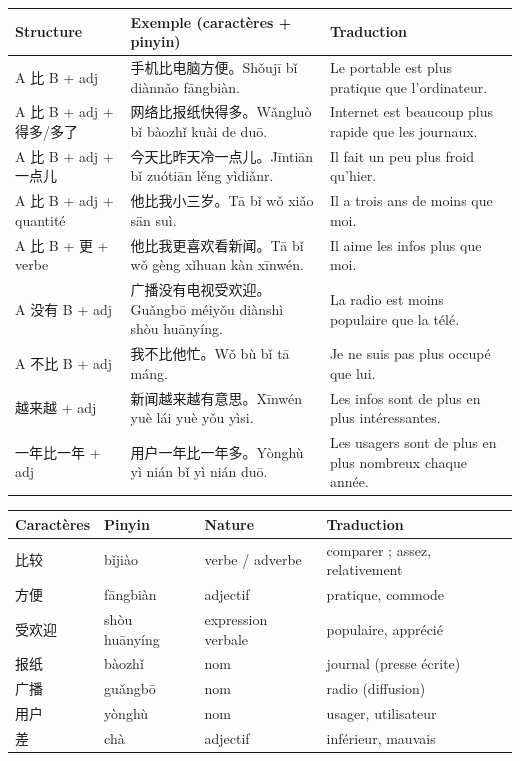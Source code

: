 \documentclass[11pt]{article}
\begin{document}
\begin{center}
\begin{tabularx}{\linewidth}{|X|X|X|}
\hline
\rowcolor{popblueL} Structure & Exemple (caractères + pinyin) & Traduction \\
\hline
A 比 B + adj & 手机比电脑方便。Shǒujī bǐ diànnǎo fāngbiàn. & Le portable est plus pratique que l'ordinateur. \\
\hline
A 比 B + adj + 得多/多了 & 网络比报纸快得多。Wǎngluò bǐ bàozhǐ kuài de duō. & Internet est beaucoup plus rapide que les journaux. \\
\hline
A 比 B + adj + 一点儿 & 今天比昨天冷一点儿。Jīntiān bǐ zuótiān lěng yìdiǎnr. & Il fait un peu plus froid qu'hier. \\
\hline
A 比 B + adj + quantité & 他比我小三岁。Tā bǐ wǒ xiǎo sān suì. & Il a trois ans de moins que moi. \\
\hline
A 比 B + 更 + verbe & 他比我更喜欢看新闻。Tā bǐ wǒ gèng xǐhuan kàn xīnwén. & Il aime les infos plus que moi. \\
\hline
A 没有 B + adj & 广播没有电视受欢迎。Guǎngbō méiyǒu diànshì shòu huānyíng. & La radio est moins populaire que la télé. \\
\hline
A 不比 B + adj & 我不比他忙。Wǒ bù bǐ tā máng. & Je ne suis pas plus occupé que lui. \\
\hline
越来越 + adj & 新闻越来越有意思。Xīnwén yuè lái yuè yǒu yìsi. & Les infos sont de plus en plus intéressantes. \\
\hline
一年比一年 + adj & 用户一年比一年多。Yònghù yì nián bǐ yì nián duō. & Les usagers sont de plus en plus nombreux chaque année. \\
\hline
\end{tabularx}
\end{center}

\begin{center}
\begin{tabularx}{\linewidth}{|X|X|X|X|}
\hline
\rowcolor{popblueL} Caractères & Pinyin & Nature & Traduction \\
\hline
比较 & bǐjiào & verbe / adverbe & comparer ; assez, relativement \\
\hline
方便 & fāngbiàn & adjectif & pratique, commode \\
\hline
受欢迎 & shòu huānyíng & expression verbale & populaire, apprécié \\
\hline
报纸 & bàozhǐ & nom & journal (presse écrite) \\
\hline
广播 & guǎngbō & nom & radio (diffusion) \\
\hline
用户 & yònghù & nom & usager, utilisateur \\
\hline
差 & chà & adjectif & inférieur, mauvais \\
\hline
\end{tabularx}
\end{center}
\end{document}
